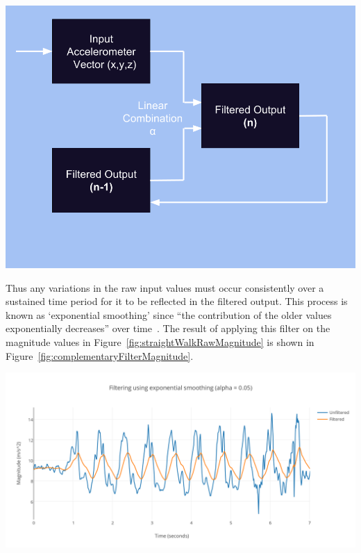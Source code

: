 \documentclass[main.tex]{subfiles}
\begin{document}
\begin{center}
\includegraphics[scale=0.3]{images/complementaryFilter.png}
\label{fig:complementaryFilter}
\end{center}
Thus any variations in the raw input values must occur consistently over a sustained time period for it to be reflected in the filtered output. This process is known as `exponential smoothing' since ``the contribution of the older values exponentially decreases'' over time~\cite[p.2528]{casiez20121}. The result of applying this filter on the magnitude values in Figure~\ref{fig:straightWalkRawMagnitude} is shown in Figure~\ref{fig:complementaryFilterMagnitude}. 

\begin{center}
\includegraphics[scale=0.9]{images/complementaryFilterMagnitude.png}
\label{fig:complementaryFilterMagnitude}
\end{center}
\end{document}
